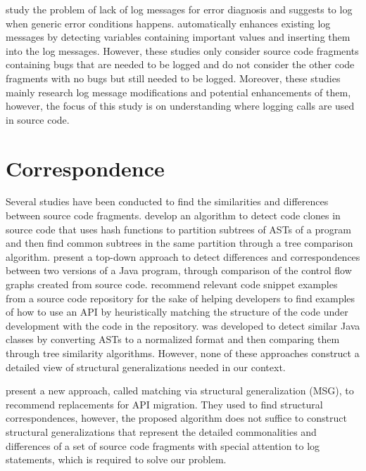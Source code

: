 \citet{yuan2012conservative} study the problem of lack of log messages for error diagnosis and suggests to log when generic error conditions happens.  \cite{yuan2012improving} automatically enhances existing log messages by detecting variables containing important values and inserting them into the log messages. However, these studies only consider source code fragments containing bugs that are needed to be logged and do not consider the other code fragments with no bugs but still needed to be logged. Moreover, these studies mainly research log message modifications and potential enhancements of them, however, the focus of this study is on understanding where logging calls are used in source code.

\section{Correspondence}  \label{ch7-corr}
Several studies have been conducted to find the similarities and differences between source code fragments. \citet{baxter1998clone} develop an algorithm to detect code clones in source code that uses hash functions to partition subtrees of ASTs of a program and then find common subtrees in the same partition through a tree comparison algorithm. \citet{apiwattanapong2004differencing} present a top-down approach to detect differences and correspondences between two versions of a Java program, through comparison of the control flow graphs created from source code. \citet{holmes2005strathcona} recommend relevant code snippet examples from a source code repository for the sake of helping developers to find examples of how to use an API by heuristically matching the structure of the code under development with the code in the repository.  \cite{sager2006detecting} was developed to detect similar Java classes by converting ASTs to a normalized format and then comparing them through tree similarity algorithms. However, none of these approaches construct a detailed view of structural generalizations needed in our context.

\citet{2014:uofc:cossette} present a new approach, called matching via structural generalization (MSG), to recommend replacements for API migration. They used  to find structural correspondences, however, the proposed algorithm does not suffice to construct structural generalizations that represent the detailed commonalities and differences of a set of source code fragments with special attention to log statements, which is required to solve our problem.

